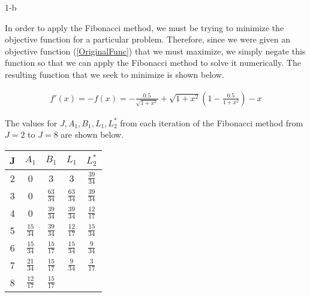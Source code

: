 \documentclass[11pt]{article}
\begin{document}
\begin{prob}{1-b}
\end{prob}
\begin{sol} 

In order to apply the Fibonacci method, we must be trying to minimize the objective function for a particular problem. Therefore, since we were given an objective function (\ref{OriginalFunc}) that we must maximize, we simply negate this function so that we can apply the Fibonacci method to solve it numerically. The resulting function that we seek to minimize is shown below.

\begin{eqnarray*}
f'(x) = -f(x) =-\frac{0.5}{\sqrt{1+x^2}}+\sqrt{1+x^2} \left(1-\frac{0.5}{1+x^2}\right)-x 
\end{eqnarray*}

The values for $J, A_{1}, B_{1}, L_{1}, L_{2}^*$ from each iteration of the Fibonacci method from $J=2$ to $J=8$ are shown below.

\begin{center}
  \begin{tabular}{| c | c | c | c | c |}
    \hline
	J & $A_{1}$ & $B_{1}$ & \textbf{$L_{1}$} & \textbf{$L_{2}^{*}$} \\ \hline
	2 & 0 & 3 & 3 & $\frac{39}{34}$ \\ \hline
	3 & 0 & $\frac{63}{34}$ & $\frac{63}{34}$ & $\frac{39}{34}$ \\ \hline
	4 & 0 & $\frac{39}{34}$ & $\frac{39}{34}$ & $\frac{12}{17}$ \\ \hline
	5 & $\frac{15}{34}$ & $\frac{39}{34}$ & $\frac{12}{17}$ & $\frac{15}{34}$ \\ \hline
	6 & $\frac{15}{34}$ & $\frac{15}{17}$ & $\frac{15}{34}$ & $\frac{9}{34}$ \\ \hline
	7 & $\frac{21}{34}$ & $\frac{15}{17}$ & $\frac{9}{34}$ & $\frac{3}{17}$ \\ \hline
	8 & $\frac{12}{17}$ & $\frac{15}{17}$ 
  \end{tabular}
\end{center}

\end{sol}
\end{document}
